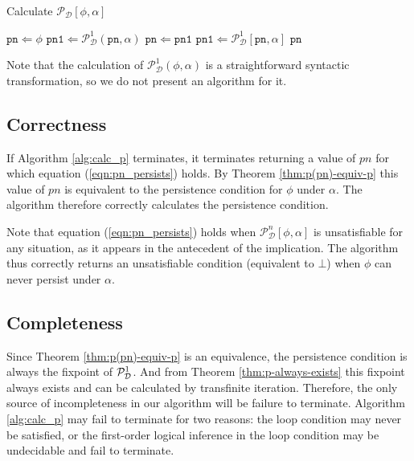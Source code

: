 %
\begin{algorithm}
\caption{Calculate $\mathcal{P}_{\mathcal{D}}[\phi,\alpha]$}


\label{alg:calc_p} \begin{algorithmic} \STATE $\mathtt{pn}\Leftarrow\phi$
\STATE $\mathtt{pn1}\Leftarrow\mathcal{P}_{\mathcal{D}}^{1}(\mathtt{pn},\alpha)$
\STATE $\mathtt{pn}\Leftarrow\mathtt{pn1}$ \STATE $\mathtt{pn1}\Leftarrow\mathcal{P}_{\mathcal{D}}^{1}[\mathtt{pn},\alpha]$
\ENDWHILE \RETURN $\mathtt{pn}$ \end{algorithmic} 
\end{algorithm}


Note that the calculation of $\mathcal{P}_{\mathcal{D}}^{1}(\phi,\alpha)$
is a straightforward syntactic transformation, so we do not present
an algorithm for it.


\subsection{Correctness}

If Algorithm \ref{alg:calc_p} terminates, it terminates returning
a value of $pn$ for which equation (\ref{eqn:pn_persists}) holds.
By Theorem \ref{thm:p(pn)-equiv-p} this value of $pn$ is equivalent
to the persistence condition for $\phi$ under $\alpha$. The algorithm
therefore correctly calculates the persistence condition.

Note that equation (\ref{eqn:pn_persists}) holds when $\mathcal{P}_{\mathcal{D}}^{n}[\phi,\alpha]$
is unsatisfiable for any situation, as it appears in the antecedent
of the implication. The algorithm thus correctly returns an unsatisfiable
condition (equivalent to $\bot$) when $\phi$ can never persist under
$\alpha$.


\subsection{Completeness}

Since Theorem \ref{thm:p(pn)-equiv-p} is an equivalence, the persistence
condition is always the fixpoint of $\mathcal{P}^{1}_{\mathcal{D}}$. And from Theorem \ref{thm:p-always-exists}
this fixpoint always exists and can be calculated by transfinite iteration.
Therefore, the only source of incompleteness in our algorithm will
be failure to terminate. Algorithm \ref{alg:calc_p} may fail to terminate
for two reasons: the loop condition may never be satisfied, or the
first-order logical inference in the loop condition may be undecidable
and fail to terminate.

